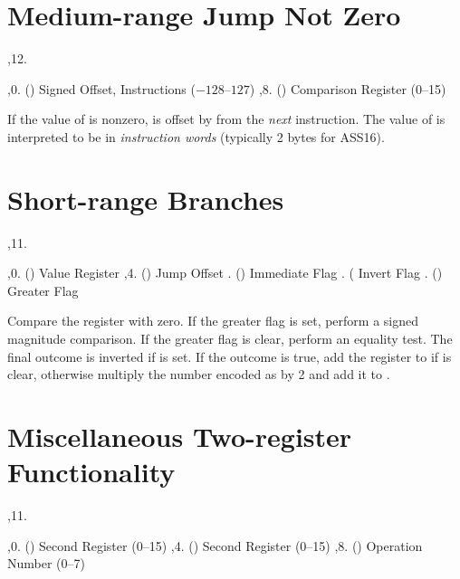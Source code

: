 \bigskip
{
	\tabskip=3pt
}
\bigskip

\section{Medium-range Jump Not Zero}

\noindent\ins{},12. 

\li \ins{},0. () Signed Offset, Instructions ($-128$--$127$)
\li \ins{},8. () Comparison Register (0--15)

If the value of  is nonzero,  is offset by  from the
{\it next} instruction. The value of  is interpreted to be in {\it
instruction words} (typically 2 bytes for ASS16).

\section{Short-range Branches}

\noindent\ins{},11. 

\li \ins{},0. () Value Register
\li \ins{},4. () Jump Offset
\li \ins{}. () Immediate Flag
\li \ins{}. ( Invert Flag
\li \ins{}. () Greater Flag

Compare the  register with zero. If the greater flag is set, perform a signed
magnitude comparison. If the greater flag is clear, perform an equality test. The final
outcome is inverted if  is set. If the outcome is true, add the  register
to  if  is clear, otherwise multiply the number encoded as  by
2 and add it to .

\section{Miscellaneous Two-register Functionality}

\noindent\ins{},11. 

\li \ins{},0. () Second Register (0--15)
\li \ins{},4. () Second Register (0--15)
\li \ins{},8. () Operation Number (0--7)

\bigskip
{
	\offinterlineskip
}
\bigskip


